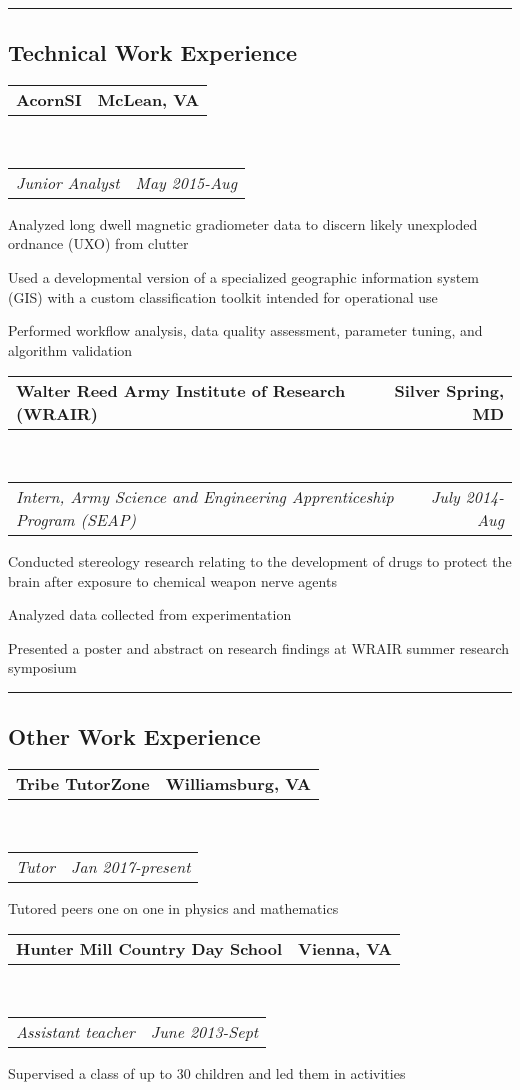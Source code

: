 \documentclass[10pt,letterpaper]{article}
\makeatletter
\newcommand{\headerrow}[2]
{\begin{tabular*}{\linewidth}{l@{\extracolsep{\fill}}r}
	#1 &
	#2 \\
\end{tabular*}}
\makeatother
\begin{document}
\hrule
\vspace{-0.4em}
\subsection*{Technical Work Experience}

	\headerrow
		{\textbf{AcornSI}}
		{\textbf{McLean, VA}}
	\\
	\headerrow
		{\emph{Junior Analyst}}
		{\emph{May 2015-Aug}}
	\begin{itemize*}
		\item Analyzed long dwell magnetic gradiometer data to
			discern likely unexploded ordnance (UXO) from clutter
		\item Used a developmental version of a specialized geographic information system (GIS) with 			a custom classification toolkit intended for operational use
		\item Performed workflow analysis, data
quality assessment, parameter tuning, and algorithm validation
	\end{itemize*}
	\headerrow
		{\textbf{Walter Reed Army Institute of Research (WRAIR)}}
		{\textbf{Silver Spring, MD}}
	\\
	\headerrow
		{\emph{Intern, Army Science and Engineering Apprenticeship Program (SEAP)}}
		{\emph{July 2014-Aug}}
	\begin{itemize*}
		\item Conducted stereology research relating to the development of drugs to protect the brain after exposure to chemical weapon nerve agents
		\item Analyzed data collected from experimentation
		\item Presented a poster and abstract on research findings at WRAIR summer research symposium
	\end{itemize*}
	
\hrule
\vspace{-0.4em}
\subsection*{Other Work Experience}

	\headerrow
		{\textbf{Tribe TutorZone}}
		{\textbf{Williamsburg, VA}}
	\\
	\headerrow
		{\emph{Tutor}}
		{\emph{Jan 2017-present}}
	\begin{itemize*}
		\item Tutored peers one on one in physics and mathematics
	\end{itemize*}
	\headerrow
		{\textbf{Hunter Mill Country Day School}}
		{\textbf{Vienna, VA}}
	\\
	\headerrow
		{\emph{Assistant teacher}}
		{\emph{June 2013-Sept}}
	\begin{itemize*}
		\item Supervised a class of up to 30 children and led them in activities
	\end{itemize*}
	
\end{document}
